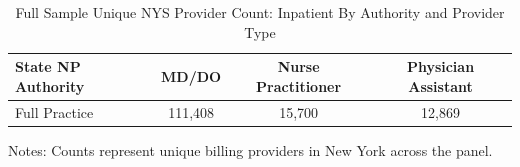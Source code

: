 \documentclass{article}
\begin{document}
\begin{table}[htbp]
\centering
\caption{Full Sample Unique NYS Provider Count: Inpatient By Authority and Provider Type}
\label{tab:inpatient_auth_x_provtype_full}
\begin{threeparttable}
\begin{tabular}{lccc}
\toprule
\textbf{State NP Authority} & \textbf{MD/DO} & \textbf{Nurse Practitioner} & \textbf{Physician Assistant} \\
\midrule
        Full Practice & 111,408 & 15,700 & 12,869 \\
\bottomrule
\end{tabular}
\begin{tablenotes}[flushleft]
\footnotesize
\item Notes: Counts represent unique billing providers in New York across the panel.
\end{tablenotes}
\end{threeparttable}
\end{table}
\end{document}
